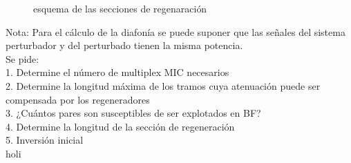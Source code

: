 \begin{exercise}[7]
\begin{figure}[htp]
\caption{esquema de las secciones de regenaración}
\end{figure}
Nota: Para el cálculo de la diafonía se puede suponer que las señales del sistema perturbador y del perturbado tienen la misma potencia.\\
Se pide:\\
1. Determine el número de multiplex MIC necesarios\\
2. Determine la longitud máxima de los tramos cuya atenuación puede ser compensada por los regeneradores\\
3. ¿Cuántos pares son susceptibles de ser explotados en BF?\\
4. Determine la longitud de la sección de regeneración\\
5. Inversión inicial\\
holi
\end{exercise}
